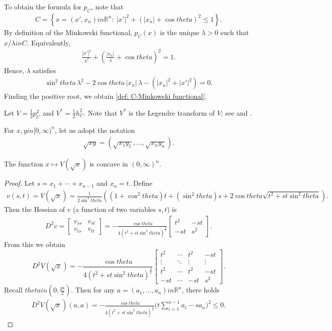 \documentclass[12pt]{amsart}
\def\theta{theta}%
\def\pi{pi}%
\def\in{in }%
\numberwithin{equation}{section}
\newcommand{\bbR}{\mathbb{R}}
\newcommand{\8}{\infty}
\newcommand{\la}{\lambda}
\renewcommand{\(}{\left(}
\renewcommand{\)}{\right)}
\newcommand{\eq}[1]{\begin{equation}\begin{alignedat}{2} #1 \end{alignedat}\end{equation}}
\begin{document}
To obtain the formula for $p_C$, note that
\eq{
C=\left\{x=(x',x_n)\in \bbR^n:\ |x'|^2+\(|x_n|+\cos\theta\)^2\le 1\right\}.
}
By definition of the Minkowski functional, $p_C(x)$ is the unique $\la>0$ such that $x/\la\in C$. Equivalently,
\eq{
\frac{|x'|^2}{\la^2}+\left(\frac{|x_n|}{\la}+\cos\theta\right)^2=1.
}
Hence, $\la$ satisfies
\eq{
\sin^2\theta\,\la^2-2\cos\theta\,|x_n|\,\la-\(|x_n|^2+|x'|^2\)=0.
}
Finding the positive root, we obtain \eqref{def: C-Minkowski functional}.

Let $V=\frac{1}{2}p_C^2$ and $V^{\ast}=\frac{1}{2}h_C^2$. Note that $V^{\ast}$ is the Legendre transform of $V$; see \cite[eq. (1.49)]{Schneider} and \cite[Lem. 1.7.13]{Schneider}.

For $x,y\in [0,\infty)^n$, let us adopt the notation
\eq{
\sqrt{xy}=(\sqrt{x_1y_1},\ldots, \sqrt{x_ny_n}).
}

\begin{lemma}\label{lem 1} The function
 $x\mapsto V(\sqrt{x})$ is concave in $(0,\infty)^n$.
\end{lemma}
\begin{proof}
Let $s=x_1+\cdots+x_{n-1}$ and $x_n=t$. Define
\eq{
v(s,t)=V(\sqrt{x})=\frac{1}{2\sin^4\theta}\left((1+\cos^2\theta)t+(\sin^2\theta)s +2\cos\theta \sqrt{t^2+s t\sin^2\theta}\right).
}
Then the Hessian of $v$ (a function of two variables $s,t$) is
\eq{
D^2v=\begin{bmatrix}
v_{ss} & v_{st}\\
v_{ts} & v_{tt}
\end{bmatrix}=-\frac{\cos\theta}{4(t^2+s t\sin^2\theta)^\frac{3}{2}}\begin{bmatrix}
    t^2 & -st \\
    -st & s^2
\end{bmatrix}.
}
From this we obtain
\begin{equation}
D^2V(\sqrt{x}) = -\frac{\cos\theta}{4(t^2+s t\sin^2\theta)^\frac{3}{2}}
\begin{bmatrix}
t^2 & \cdots & t^2 & -st \\
\vdots & \ddots & \vdots & \vdots \\
t^2 & \cdots & t^2 & -st \\
-st& \cdots & -st & s^2
\end{bmatrix}.
\end{equation}
Recall $\theta\in (0,\frac{\pi}{2})$. Then for any $a=(a_1,\ldots, a_n)\in \mathbb{R}^n$, there holds
\eq{
D^2V(\sqrt{x})(a,a)=-\frac{\cos\theta}{4(t^2+s t\sin^2\theta)^{\frac{3}{2}}}\big(t\sum_{i=1}^{n-1}a_i-sa_n\big)^2 \leq 0.
}
\end{proof}
\end{document}
